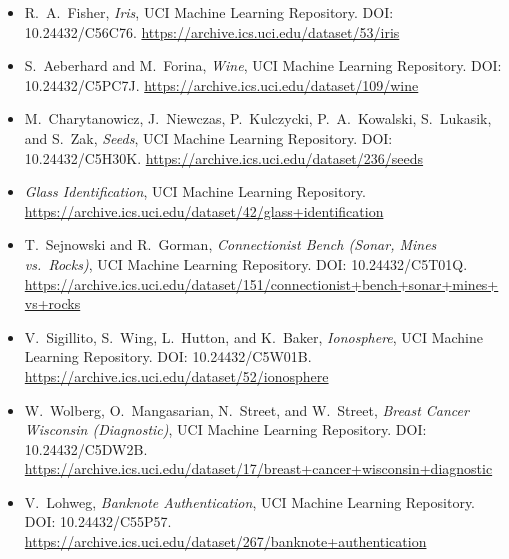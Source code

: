 \documentclass[conference]{IEEEtran}
\begin{document}
\begin{itemize}
\item R.~A.~Fisher, \emph{Iris}, UCI Machine Learning Repository. DOI: 10.24432/C56C76. \url{https://archive.ics.uci.edu/dataset/53/iris}
\item S.~Aeberhard and M.~Forina, \emph{Wine}, UCI Machine Learning Repository. DOI: 10.24432/C5PC7J. \url{https://archive.ics.uci.edu/dataset/109/wine}
\item M.~Charytanowicz, J.~Niewczas, P.~Kulczycki, P.~A.~Kowalski, S.~Lukasik, and S.~Zak, \emph{Seeds}, UCI Machine Learning Repository. DOI: 10.24432/C5H30K. \url{https://archive.ics.uci.edu/dataset/236/seeds}
\item \emph{Glass Identification}, UCI Machine Learning Repository. \url{https://archive.ics.uci.edu/dataset/42/glass+identification}
\item T.~Sejnowski and R.~Gorman, \emph{Connectionist Bench (Sonar, Mines vs.\ Rocks)}, UCI Machine Learning Repository. DOI: 10.24432/C5T01Q. \url{https://archive.ics.uci.edu/dataset/151/connectionist+bench+sonar+mines+vs+rocks}
\item V.~Sigillito, S.~Wing, L.~Hutton, and K.~Baker, \emph{Ionosphere}, UCI Machine Learning Repository. DOI: 10.24432/C5W01B. \url{https://archive.ics.uci.edu/dataset/52/ionosphere}
\item W.~Wolberg, O.~Mangasarian, N.~Street, and W.~Street, \emph{Breast Cancer Wisconsin (Diagnostic)}, UCI Machine Learning Repository. DOI: 10.24432/C5DW2B. \url{https://archive.ics.uci.edu/dataset/17/breast+cancer+wisconsin+diagnostic}
\item V.~Lohweg, \emph{Banknote Authentication}, UCI Machine Learning Repository. DOI: 10.24432/C55P57. \url{https://archive.ics.uci.edu/dataset/267/banknote+authentication}
\end{itemize}



\end{document}
